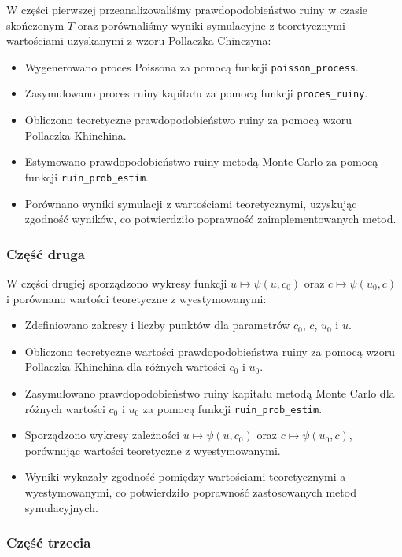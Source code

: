 \documentclass[12pt,letterpaper]{article}
\theoremstyle{definition}
\begin{document}
W części pierwszej przeanalizowaliśmy prawdopodobieństwo ruiny w czasie skończonym \( T \) oraz porównaliśmy wyniki symulacyjne z teoretycznymi wartościami uzyskanymi z wzoru Pollaczka-Chinczyna:
\begin{itemize}
    \item Wygenerowano proces Poissona za pomocą funkcji \texttt{poisson\_process}.
    \item Zasymulowano proces ruiny kapitału za pomocą funkcji \texttt{proces\_ruiny}.
    \item Obliczono teoretyczne prawdopodobieństwo ruiny za pomocą wzoru Pollaczka-Khinchina.
    \item Estymowano prawdopodobieństwo ruiny metodą Monte Carlo za pomocą funkcji \texttt{ruin\_prob\_estim}.
    \item Porównano wyniki symulacji z wartościami teoretycznymi, uzyskując zgodność wyników, co potwierdziło poprawność zaimplementowanych metod.
\end{itemize}

\subsubsection{Część druga}

W części drugiej sporządzono wykresy funkcji \( u \mapsto \psi(u, c_0) \) oraz \( c \mapsto \psi(u_0, c) \) i porównano wartości teoretyczne z wyestymowanymi:
\begin{itemize}
    \item Zdefiniowano zakresy i liczby punktów dla parametrów \( c_0 \), \( c \), \( u_0 \) i \( u \).
    \item Obliczono teoretyczne wartości prawdopodobieństwa ruiny za pomocą wzoru Pollaczka-Khinchina dla różnych wartości \( c_0 \) i \( u_0 \).
    \item Zasymulowano prawdopodobieństwo ruiny kapitału metodą Monte Carlo dla różnych wartości \( c_0 \) i \( u_0 \) za pomocą funkcji \texttt{ruin\_prob\_estim}.
    \item Sporządzono wykresy zależności \( u \mapsto \psi(u, c_0) \) oraz \( c \mapsto \psi(u_0, c) \), porównując wartości teoretyczne z wyestymowanymi.
    \item Wyniki wykazały zgodność pomiędzy wartościami teoretycznymi a wyestymowanymi, co potwierdziło poprawność zastosowanych metod symulacyjnych.
\end{itemize}

\subsubsection{Część trzecia}
\end{document}
